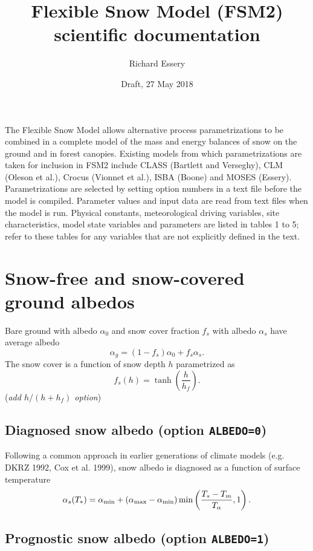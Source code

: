 \documentclass{article}
\title{Flexible Snow Model (FSM2) scientific documentation}
\author{Richard Essery}
\date{Draft, 27 May 2018}
\begin{document}
\maketitle

The Flexible Snow Model allows alternative process parametrizations to be combined in a complete model of the mass and energy balances of snow on the ground and in forest canopies. Existing models from which parametrizations are taken for inclusion in FSM2 include CLASS (Bartlett and Verseghy), CLM (Oleson et al.), Crocus (Vionnet et al.), ISBA (Boone) and MOSES (Essery). Parametrizations are selected by setting option numbers in a text file before the model is compiled. Parameter values and input data are read from text files when the model is run. Physical constants, meteorological driving variables, site characteristics, model state variables and parameters are listed in tables 1 to 5; refer to these tables for any variables that are not explicitly defined in the text.
\section{Snow-free and snow-covered ground albedos}

Bare ground with albedo $\alpha_0$ and snow cover fraction $f_s$ with albedo $\alpha_s$ have average albedo
\begin{equation}
\alpha_g = (1 - f_s)\alpha_0 +f_s\alpha_s.
\end{equation} 
The snow cover is a function of snow depth $h$ parametrized as
\begin{equation}
f_s(h) = \tanh\left(\frac{h}{h_f}\right).
\end{equation}
({\it add $h/(h+h_f)$ option})

\subsection{Diagnosed snow albedo (option {\tt ALBEDO=0})}

Following a common approach in earlier generations of climate models (e.g. DKRZ 1992, Cox et al. 1999), snow albedo is diagnosed as a function of surface temperature 
\begin{equation}
\alpha_s(T_*) = \alpha_{\rm min} + (\alpha_{\rm max} - \alpha_{\rm min})
                \min\left(\frac{T_* - T_m}{T_\alpha}, 1\right).        
\end{equation}

\subsection{Prognostic snow albedo (option {\tt ALBEDO=1})}
\end{document}
